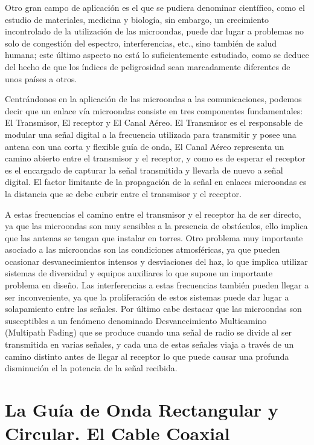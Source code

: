 \documentclass[12pt]{article}
\begin{document}
Otro gran campo de aplicaci\'on es el que se pudiera denominar cient\'ifico, como el estudio de materiales, medicina y biolog\'ia, sin embargo, un crecimiento incontrolado de la utilizaci\'on de las microondas, puede dar lugar a problemas no solo de congesti\'on del espectro, interferencias, etc., sino tambi\'en de salud humana; este \'ultimo aspecto no est\'a lo suficientemente estudiado, como se deduce del hecho de que los \'indices de peligrosidad sean marcadamente diferentes de unos pa\'ises a otros.
\vspace{0.4cm}
	
Centr\'andonos en la aplicaci\'on de las microondas a las comunicaciones, podemos decir que un enlace v\'ia microondas consiste en tres componentes fundamentales: El Transmisor, El receptor y El Canal A\'ereo. El Transmisor es el responsable de modular una se\~nal digital a la frecuencia utilizada para transmitir y posee una antena con una corta y flexible gu\'ia de onda, El Canal A\'ereo representa un camino abierto entre el transmisor y el receptor, y como es de esperar el receptor es el encargado de capturar la se\~nal transmitida y llevarla de nuevo a se\~nal digital. El factor limitante de la propagaci\'on de la se\~nal en enlaces microondas es la distancia que se debe cubrir entre el transmisor y el receptor.
\vspace{0.4cm}
	
A estas frecuencias el camino entre el transmisor y el receptor ha de ser directo, ya que las microondas son muy sensibles a la presencia de obst\'aculos, ello implica que las antenas se tengan que instalar en torres. Otro problema muy importante asociado a las microondas son las condiciones atmosf\'ericas, ya que pueden ocasionar desvanecimientos intensos y desviaciones del haz, lo que implica utilizar sistemas de diversidad y equipos auxiliares lo que supone un importante problema en dise\~no. Las interferencias a estas frecuencias tambi\'en pueden llegar a ser inconveniente, ya que la proliferaci\'on de estos sistemas puede dar lugar a solapamiento entre las se\~nales. Por \'ultimo cabe destacar que las microondas son susceptibles a un fen\'omeno denominado Desvanecimiento Multicamino (Multipath Fading) que se produce cuando una se\~nal de radio se divide al ser transmitida en varias se\~nales, y cada una de estas se\~nales viaja a trav\'es de un camino distinto antes de llegar al receptor lo que puede causar una profunda disminuci\'on el la potencia de la se\~nal recibida.


\section{La Gu\'ia de Onda Rectangular y Circular. El Cable Coaxial}
\end{document}
